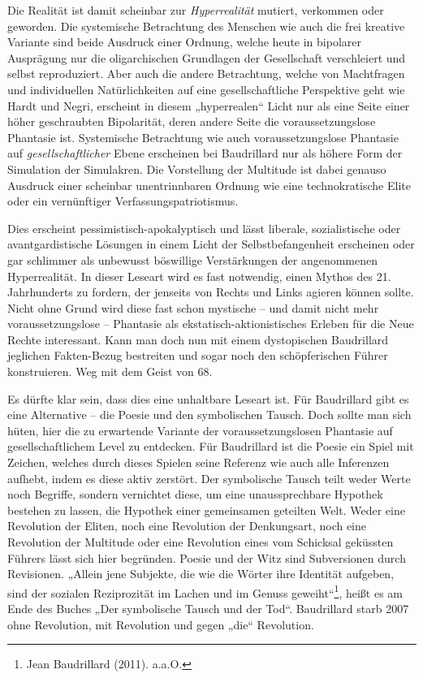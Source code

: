 \documentclass[12pt,a4paper]{article}
\begin{document}
Die Realität ist damit scheinbar zur \emph{Hyperrealität} mutiert, verkommen
oder geworden. Die systemische Betrachtung des Menschen wie auch die frei
kreative Variante sind beide Ausdruck einer Ordnung, welche heute in bipolarer
Ausprägung nur die oligarchischen Grundlagen der Gesellschaft verschleiert und
selbst reproduziert. Aber auch die andere Betrachtung, welche von Machtfragen
und individuellen Natürlichkeiten auf eine gesellschaftliche Perspektive geht
wie Hardt und Negri, erscheint in diesem „hyperrealen“ Licht nur als eine
Seite einer höher geschraubten Bipolarität, deren andere Seite die
voraussetzungslose Phantasie ist.  Systemische Betrachtung wie auch
voraussetzungslose Phantasie auf \emph{gesellschaftlicher} Ebene erscheinen
bei Baudrillard nur als höhere Form der Simulation der Simulakren.  Die
Vorstellung der Multitude ist dabei genauso Ausdruck einer scheinbar
unentrinnbaren Ordnung wie eine technokratische Elite oder ein vernünftiger
Verfassungspatriotismus.

Dies erscheint pessimistisch-apokalyptisch und lässt liberale, sozialistische
oder avantgardistische Lösungen in einem Licht der Selbstbefangenheit
erscheinen oder gar schlimmer als unbewusst böswillige Verstärkungen der
angenommenen Hyperrealität. In dieser Leseart wird es fast notwendig, einen
Mythos des 21. Jahrhunderts zu fordern, der jenseits von Rechts und Links
agieren können sollte. Nicht ohne Grund wird diese fast schon mystische -- und
damit nicht mehr voraussetzungslose -- Phantasie als
ekstatisch-aktionistisches Erleben für die Neue Rechte interessant. Kann man
doch nun mit einem dystopischen Baudrillard jeglichen Fakten-Bezug bestreiten
und sogar noch den schöpferischen Führer konstruieren. Weg mit dem Geist von
68.

Es dürfte klar sein, dass dies eine unhaltbare Leseart ist. Für Baudrillard
gibt es eine Alternative -- die Poesie und den symbolischen Tausch. Doch
sollte man sich hüten, hier die zu erwartende Variante der voraussetzungslosen
Phantasie auf gesellschaftlichem Level zu entdecken. Für Baudrillard ist die
Poesie ein Spiel mit Zeichen, welches durch dieses Spielen seine Referenz wie
auch alle Inferenzen aufhebt, indem es diese aktiv zerstört. Der symbolische
Tausch teilt weder Werte noch Begriffe, sondern vernichtet diese, um eine
unaussprechbare Hypothek bestehen zu lassen, die Hypothek einer gemeinsamen
geteilten Welt. Weder eine Revolution der Eliten, noch eine Revolution der
Denkungsart, noch eine Revolution der Multitude oder eine Revolution eines vom
Schicksal geküssten Führers lässt sich hier begründen. Poesie und der Witz
sind Subversionen durch Revisionen. „Allein jene Subjekte, die wie die Wörter
ihre Identität aufgeben, sind der sozialen Reziprozität im Lachen und im
Genuss geweiht“\footnote{Jean Baudrillard (2011). a.a.O.}, heißt es am Ende
des Buches „Der symbolische Tausch und der Tod“. Baudrillard starb 2007 ohne
Revolution, mit Revolution und gegen „die“ Revolution.
\end{document}
